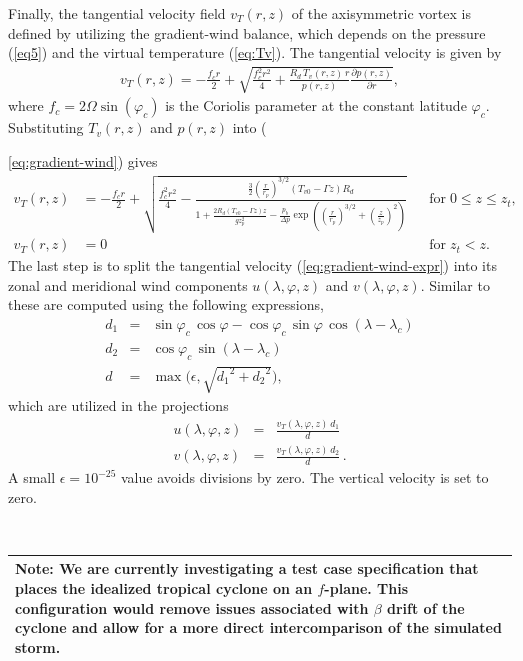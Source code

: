 \documentclass[times,doublespace]{fldauth}
\begin{document}
Finally, the tangential velocity field $v_T(r,z)$ of the axisymmetric vortex is defined by utilizing the gradient-wind balance, which depends on the pressure (\ref{eq5}) and the virtual temperature (\ref{eq:Tv}). The tangential velocity is given by
\begin{eqnarray}
\label{eq:gradient-wind}
v_T(r,z) = -\frac{f_cr}{2}+\sqrt{ \frac{f_c^2r^2}{4}+\frac{R_d \, T_v(r,z) \, r}{p(r,z)} \frac{\partial p(r,z)}{\partial r}},
\end{eqnarray}
where $f_c = 2 \Omega \sin(\varphi_c)$ is the Coriolis parameter at the constant latitude $\varphi_c$. Substituting $T_v(r,z)$ and $p(r,z)$ into ({\ref{eq:gradient-wind}) gives
\begin{align}
\label{eq:gradient-wind-expr}
v_T(r,z) & = -\frac{f_cr}{2}+\sqrt{ \frac{f_c^2r^2}{4}-\frac{\frac{3}{2} \left( \frac{r}{r_p}\right)^{3/2} (T_{v0}-\Gamma z) R_d}{1+\frac{2R_d(T_{v0}-\Gamma z)z}{g z_p^2}-\frac{p_b}{\Delta p}\exp\left({\left (\frac{r}{r_p} \right ) ^{3/2}} + {\left (\frac{z}{z_p} \right ) ^{2}} \right)}} & & \mbox{for} \; 0 \le z \le z_t, \nonumber \\
v_T(r,z) & = 0 & & \mbox{for} \; z_t < z.
\end{align}  The last step is to split the tangential velocity (\ref{eq:gradient-wind-expr}) into its zonal and meridional wind components $u(\lambda,\varphi,z)$ and $v(\lambda,\varphi,z)$. Similar to \cite{nair2008moving} these are computed using the following expressions,
\begin{eqnarray}
d_1 &=& \sin\varphi_c \, \cos\varphi - \cos\varphi_c \, \sin\varphi \, \cos(\lambda-\lambda_c) \\
d_2 &=& \cos\varphi_c \, \sin(\lambda-\lambda_c) \\
d &=& \max \big({\epsilon,\sqrt{ {d_1}^2 + {d_2}^2} } \big),
\end{eqnarray}
which are utilized in the projections
\begin{eqnarray}
\label{eqn:u_wind}
u(\lambda,\varphi,z) &=& \frac{v_T(\lambda,\varphi,z) \, d_1}{d}\\ \label{eqn:v_wind}
v(\lambda,\varphi,z) &=& \frac{v_T(\lambda,\varphi,z) \, d_2}{d} \,.
\end{eqnarray}
A small $\epsilon = 10^{-25}$ value avoids divisions by zero.  The vertical velocity is set to zero.

\ \\
\noindent \begin{tabular}{|p{\textwidth}|}
\hline \textbf{Note:} We are currently investigating a test case specification that places the idealized tropical cyclone on an $f$-plane.  This configuration would remove issues associated with $\beta$ drift of the cyclone and allow for a more direct intercomparison of the simulated storm. \\
\hline
\end{tabular}

}
\end{document}
